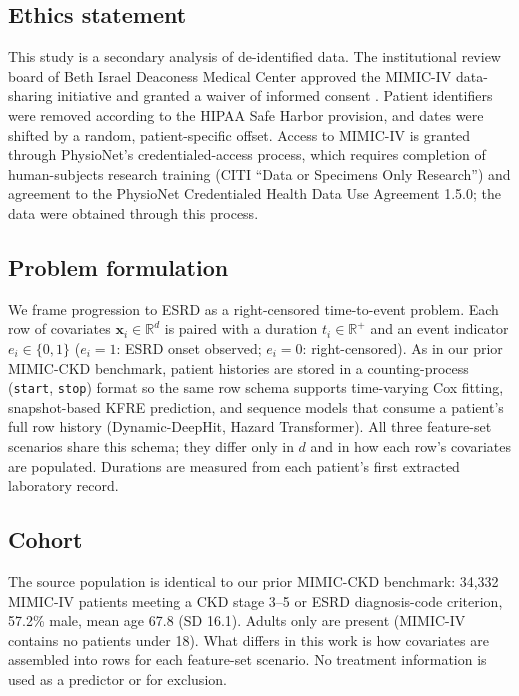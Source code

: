 \documentclass[10pt,letterpaper]{article}
\begin{document}
\subsection*{Ethics statement} \label{sec:ethics}
This study is a secondary analysis of de-identified data. The institutional review board of Beth Israel Deaconess Medical Center approved the MIMIC-IV data-sharing initiative and granted a waiver of informed consent \cite{johnson2023mimic_ehr,mimiciv_v22}. Patient identifiers were removed according to the HIPAA Safe Harbor provision, and dates were shifted by a random, patient-specific offset. Access to MIMIC-IV is granted through PhysioNet's credentialed-access process, which requires completion of human-subjects research training (CITI ``Data or Specimens Only Research'') and agreement to the PhysioNet Credentialed Health Data Use Agreement 1.5.0; the data were obtained through this process.

\subsection*{Problem formulation}
We frame progression to ESRD as a right-censored time-to-event problem. Each row of covariates $\boldsymbol{x}_i \in \mathbb{R}^d$ is paired with a duration $t_i \in \mathbb{R}^+$ and an event indicator $e_i \in \{0,1\}$ ($e_i=1$: ESRD onset observed; $e_i=0$: right-censored). As in our prior MIMIC-CKD benchmark, patient histories are stored in a counting-process (\texttt{start}, \texttt{stop}) format so the same row schema supports time-varying Cox fitting, snapshot-based KFRE prediction, and sequence models that consume a patient's full row history (Dynamic-DeepHit, Hazard Transformer). All three feature-set scenarios share this schema; they differ only in $d$ and in how each row's covariates are populated. Durations are measured from each patient's first extracted laboratory record.

\subsection*{Cohort} \label{sec:cohort}
The source population is identical to our prior MIMIC-CKD benchmark: 34{,}332 MIMIC-IV patients meeting a CKD stage 3--5 or ESRD diagnosis-code criterion, 57.2\% male, mean age 67.8 (SD 16.1). Adults only are present (MIMIC-IV contains no patients under 18). What differs in this work is how covariates are assembled into rows for each feature-set scenario. No treatment information is used as a predictor or for exclusion.
\end{document}
